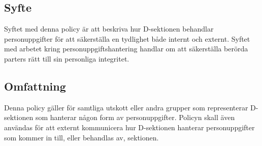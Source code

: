 \documentclass{datateknologsektionen-document}
\begin{document}
\subsection{Syfte}
Syftet med denna policy är att beskriva hur D-sektionen behandlar personuppgifter för att säkerställa en tydlighet både internt och externt.
Syftet med arbetet kring personuppgiftshantering handlar om att säkerställa berörda parters rätt till sin personliga integritet.

\subsection{Omfattning}
Denna policy gäller för samtliga utskott eller andra grupper som representerar D-sektionen som hanterar någon form av personuppgifter.
Policyn skall även användas för att externt kommunicera hur D-sektionen hanterar personuppgifter som kommer in till, eller behandlas av, sektionen.
\end{document}
